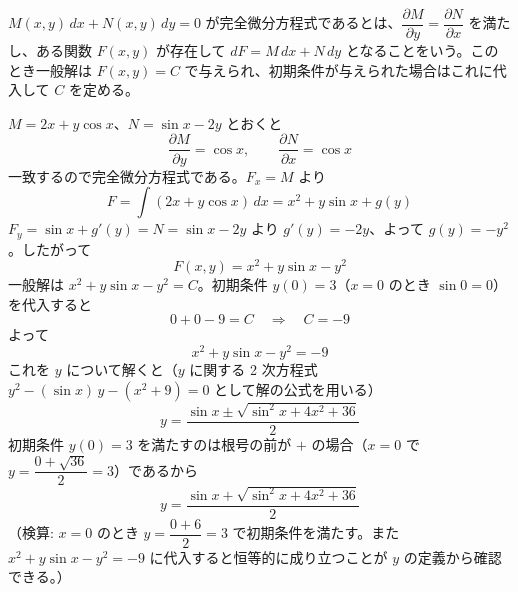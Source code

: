 
$M(x,y)\,dx + N(x,y)\,dy = 0$ が完全微分方程式であるとは、$\dfrac{\partial M}{\partial y} = \dfrac{\partial N}{\partial x}$ を満たし、ある関数 $F(x,y)$ が存在して $dF = M\,dx + N\,dy$ となることをいう。このとき一般解は $F(x,y) = C$ で与えられ、初期条件が与えられた場合はこれに代入して $C$ を定める。

$M = 2x + y\cos x$、$N = \sin x - 2y$ とおくと
\[
\frac{\partial M}{\partial y} = \cos x, \qquad \frac{\partial N}{\partial x} = \cos x
\]
一致するので完全微分方程式である。$F_x = M$ より
\[
F = \int (2x + y\cos x)\,dx = x^{2} + y\sin x + g(y)
\]
$F_y = \sin x + g'(y) = N = \sin x - 2y$ より $g'(y) = -2y$、よって $g(y) = -y^{2}$。したがって
\[
F(x,y) = x^{2} + y\sin x - y^{2}
\]
一般解は $x^{2} + y\sin x - y^{2} = C$。初期条件 $y(0) = 3$（$x=0$ のとき $\sin 0 = 0$）を代入すると
\[
0 + 0 - 9 = C \quad\Longrightarrow\quad C = -9
\]
よって
\[
x^{2} + y\sin x - y^{2} = -9
\]
これを $y$ について解くと（$y$ に関する 2 次方程式 $y^{2} - (\sin x)\,y - (x^{2}+9) = 0$ として解の公式を用いる）
\[
y = \frac{\sin x \pm \sqrt{\sin^{2}x + 4x^{2} + 36}}{2}
\]
初期条件 $y(0) = 3$ を満たすのは根号の前が $+$ の場合（$x=0$ で $y = \dfrac{0 + \sqrt{36}}{2} = 3$）であるから
\[
\boxed{\; y = \frac{\sin x + \sqrt{\sin^{2}x + 4x^{2} + 36}}{2} \;}
\]
（検算: $x=0$ のとき $y = \dfrac{0+6}{2} = 3$ で初期条件を満たす。また $x^{2} + y\sin x - y^{2} = -9$ に代入すると恒等的に成り立つことが $y$ の定義から確認できる。）
